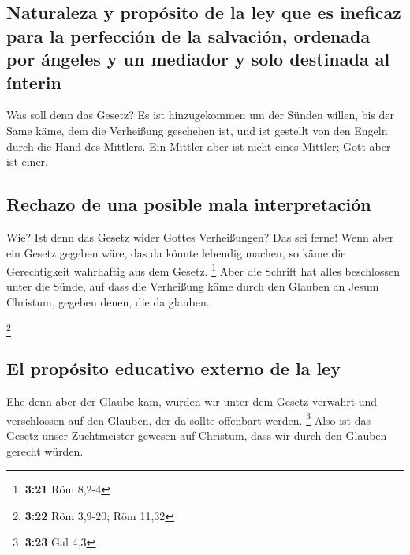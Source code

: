 \hypertarget{naturaleza-y-propuxf3sito-de-la-ley-que-es-ineficaz-para-la-perfecciuxf3n-de-la-salvaciuxf3n-ordenada-por-uxe1ngeles-y-un-mediador-y-solo-destinada-al-uxednterin}{%
\subsection{Naturaleza y propósito de la ley que es ineficaz para la
perfección de la salvación, ordenada por ángeles y un mediador y solo
destinada al
ínterin}\label{naturaleza-y-propuxf3sito-de-la-ley-que-es-ineficaz-para-la-perfecciuxf3n-de-la-salvaciuxf3n-ordenada-por-uxe1ngeles-y-un-mediador-y-solo-destinada-al-uxednterin}}

 Was soll denn das Gesetz? Es ist hinzugekommen um der
Sünden willen, bis der Same käme, dem die Verheißung geschehen ist, und
ist gestellt von den Engeln durch die Hand des Mittlers. 
Ein Mittler aber ist nicht eines Mittler; Gott aber ist einer.

\hypertarget{rechazo-de-una-posible-mala-interpretaciuxf3n}{%
\subsection{Rechazo de una posible mala
interpretación}\label{rechazo-de-una-posible-mala-interpretaciuxf3n}}

 Wie? Ist denn das Gesetz wider Gottes Verheißungen? Das
sei ferne! Wenn aber ein Gesetz gegeben wäre, das da könnte lebendig
machen, so käme die Gerechtigkeit wahrhaftig aus dem Gesetz. \footnote{\textbf{3:21}
  Röm 8,2-4}  Aber die Schrift hat alles beschlossen
unter die Sünde, auf dass die Verheißung käme durch den Glauben an Jesum
Christum, gegeben denen, die da glauben.

\footnote{\textbf{3:22} Röm 3,9-20; Röm 11,32}

\hypertarget{el-propuxf3sito-educativo-externo-de-la-ley}{%
\subsection{El propósito educativo externo de la
ley}\label{el-propuxf3sito-educativo-externo-de-la-ley}}

 Ehe denn aber der Glaube kam, wurden wir unter dem
Gesetz verwahrt und verschlossen auf den Glauben, der da sollte
offenbart werden. \footnote{\textbf{3:23} Gal 4,3}  Also
ist das Gesetz unser Zuchtmeister gewesen auf Christum, dass wir durch
den Glauben gerecht würden.

